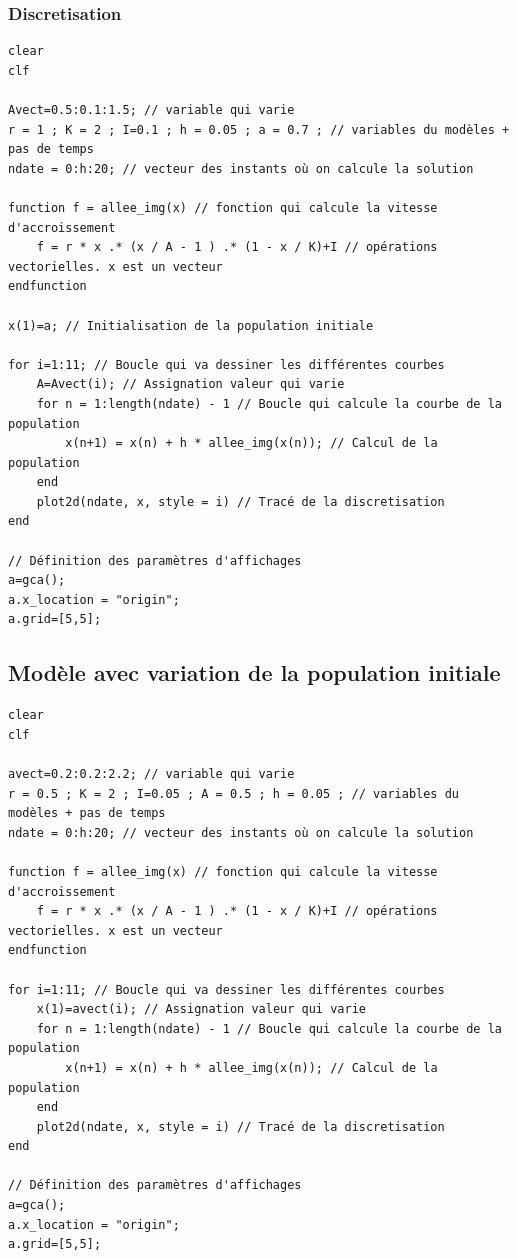 \documentclass{article}
\begin{document}
\subsubsection{Discretisation}

\begin{verbatim}
clear
clf

Avect=0.5:0.1:1.5; // variable qui varie
r = 1 ; K = 2 ; I=0.1 ; h = 0.05 ; a = 0.7 ; // variables du modèles + pas de temps
ndate = 0:h:20; // vecteur des instants où on calcule la solution

function f = allee_img(x) // fonction qui calcule la vitesse d'accroissement
    f = r * x .* (x / A - 1 ) .* (1 - x / K)+I // opérations vectorielles. x est un vecteur
endfunction

x(1)=a; // Initialisation de la population initiale

for i=1:11; // Boucle qui va dessiner les différentes courbes
    A=Avect(i); // Assignation valeur qui varie
    for n = 1:length(ndate) - 1 // Boucle qui calcule la courbe de la population
        x(n+1) = x(n) + h * allee_img(x(n)); // Calcul de la population
    end 
    plot2d(ndate, x, style = i) // Tracé de la discretisation
end

// Définition des paramètres d'affichages
a=gca();
a.x_location = "origin";
a.grid=[5,5];
\end{verbatim}

\subsection{Modèle avec variation de la population initiale}

\begin{verbatim}
clear
clf

avect=0.2:0.2:2.2; // variable qui varie
r = 0.5 ; K = 2 ; I=0.05 ; A = 0.5 ; h = 0.05 ; // variables du modèles + pas de temps
ndate = 0:h:20; // vecteur des instants où on calcule la solution

function f = allee_img(x) // fonction qui calcule la vitesse d'accroissement
    f = r * x .* (x / A - 1 ) .* (1 - x / K)+I // opérations vectorielles. x est un vecteur
endfunction

for i=1:11; // Boucle qui va dessiner les différentes courbes
    x(1)=avect(i); // Assignation valeur qui varie
    for n = 1:length(ndate) - 1 // Boucle qui calcule la courbe de la population
        x(n+1) = x(n) + h * allee_img(x(n)); // Calcul de la population
    end 
    plot2d(ndate, x, style = i) // Tracé de la discretisation
end

// Définition des paramètres d'affichages
a=gca();
a.x_location = "origin";
a.grid=[5,5];
\end{verbatim}
\end{document}
